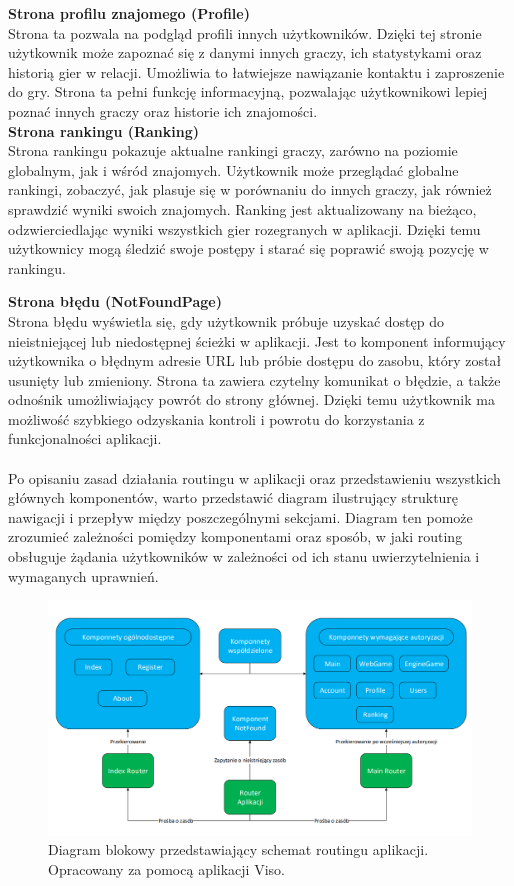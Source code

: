 \documentclass[12pt,a4paper]{article}
\begin{document}
\noindent \textbf{Strona profilu znajomego (Profile)}\\
Strona ta pozwala na podgląd profili innych użytkowników. Dzięki tej stronie użytkownik może zapoznać się z danymi innych graczy, ich statystykami oraz historią gier w relacji. Umożliwia to łatwiejsze nawiązanie kontaktu i zaproszenie do gry. Strona ta pełni funkcję informacyjną, pozwalając użytkownikowi lepiej poznać innych graczy oraz historie ich znajomości.
\\

\noindent \textbf{Strona rankingu (Ranking)}\\
Strona rankingu pokazuje aktualne rankingi graczy, zarówno na poziomie globalnym, jak i wśród znajomych. Użytkownik może przeglądać globalne rankingi, zobaczyć, jak plasuje się w porównaniu do innych graczy, jak również sprawdzić wyniki swoich znajomych. Ranking jest aktualizowany na bieżąco, odzwierciedlając wyniki wszystkich gier rozegranych w aplikacji. Dzięki temu użytkownicy mogą śledzić swoje postępy i starać się poprawić swoją pozycję w rankingu.

\newpage

\noindent \textbf{Strona błędu (NotFoundPage)}\\
Strona błędu wyświetla się, gdy użytkownik próbuje uzyskać dostęp do nieistniejącej lub niedostępnej ścieżki w aplikacji. Jest to komponent informujący użytkownika o błędnym adresie URL lub próbie dostępu do zasobu, który został usunięty lub zmieniony. Strona ta zawiera czytelny komunikat o błędzie, a także odnośnik umożliwiający powrót do strony głównej. Dzięki temu użytkownik ma możliwość szybkiego odzyskania kontroli i powrotu do korzystania z funkcjonalności aplikacji.
\\\\
Po opisaniu zasad działania routingu w aplikacji oraz przedstawieniu wszystkich głównych komponentów, warto przedstawić diagram ilustrujący strukturę nawigacji i przepływ między poszczególnymi sekcjami. Diagram ten pomoże zrozumieć zależności pomiędzy komponentami oraz sposób, w jaki routing obsługuje żądania użytkowników w zależności od ich stanu uwierzytelnienia i wymaganych uprawnień.

\vspace{1cm}
\begin{figure}[h!]
    \centering
    \includegraphics[width=1\textwidth]{images/diagram_routing.png}
    \caption{Diagram blokowy przedstawiający schemat routingu aplikacji. Opracowany za pomocą aplikacji Viso.}
\end{figure}
\end{document}
